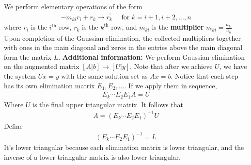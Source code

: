 \documentclass{report}
\begin{document}
\begin{itemize}
        \bigbreak \noindent 
        We perform elementary operations of the form
        \begin{align*}
            -m_{ki}r_{i} + r_{k} \to r_{k}^{\prime} \quad \text{ for } k = i+1,i+2,...,n
        \end{align*}
        where $r_{i}$ is the $i^{\text{th}}$ row, $r_{k}$ is the $k^{\text{th}}$ row, and $m_{ki}$ is the \textbf{multiplier} $m_{ki} = \frac{a_{ki}}{a_{ii}} $
        \bigbreak \noindent 
        Upon completion of the Gaussian elimination, the collected multipliers together with ones in the main diagonal and zeros in the entries above the main diagonal form the matrix $L$.
        \bigbreak \noindent 
        \textbf{Additional information:} We perform Gaussian elimination on the augmented matrix $[A|b] \to [U|y]$. Note that after we achieve $U$, we have the system $Ux = y$ with the same solution set as $Ax = b$. 
        \bigbreak \noindent 
        Notice that each step has its own elimination matrix $E_{1},E_{2},... $. If we apply them in sequence,
        \begin{align*}
            E_{k} \cdots E_{2}E_{1}A = U
        \end{align*}
        Where $U$ is the final upper triangular matrix. It follows that 
        \begin{align*}
            A = (E_{k} \cdots E_{2}E_{1})^{-1}U
        \end{align*}
        Define 
        \begin{align*}
            (E_{k} \cdots E_{2}E_{1})^{-1} = L
        \end{align*}
        It’s lower triangular because each elimination matrix is lower triangular, and the inverse of a lower triangular matrix is also lower triangular.
        \bigbreak \noindent 


\end{itemize}
\end{document}
